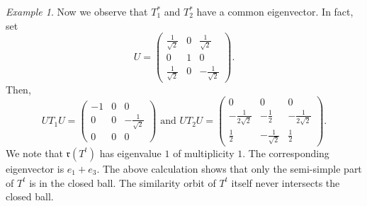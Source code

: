 \documentclass{article}
\theoremstyle{definition}
\theoremstyle{remark}
\newtheorem{example}[thm]{Example}
\numberwithin{equation}{section}
\def\fr{\mathfrak{r}}
\begin{document}
\begin{example}
Now we observe that $T_1^*$ and $T_2^*$ have a common eigenvector. In fact, set
\[
U = \begin{pmatrix} \frac{1}{\sqrt{2}} & 0 & \frac{1}{\sqrt{2}} \\ 0 & 1 & 0 \\ \frac{1}{\sqrt{2}} & 0 & -\frac{1}{\sqrt{2}} \end{pmatrix}.
\]
Then,
\[
U T_1 U = \begin{pmatrix} -1 & 0 & 0 \\ 0 & 0 & - \frac{1}{\sqrt{2}} \\ 0 & 0 & 0 \end{pmatrix} \text{ and } U T_2 U = \begin{pmatrix} 0 & 0 & 0 \\ - \frac{1}{2 \sqrt{2}} & - \frac{1}{2} & - \frac{1}{2\sqrt{2}} \\ \frac{1}{2} & - \frac{1}{\sqrt{2}} & \frac{1}{2} \end{pmatrix}.
\]
We note that $\fr(T^t)$ has eigenvalue $1$ of multiplicity $1$. The corresponding eigenvector is $e_1 + e_3$. The above calculation shows that only the semi-simple part of $T^t$ is in the closed ball. The similarity orbit of $T^t$ itself never intersects the closed ball.
\end{example}










\end{document}
